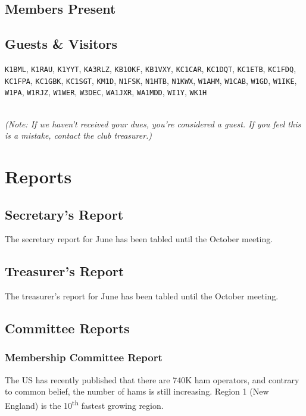 \documentclass[10pt,letterpaper]{article}
\begin{document}
\subsection{Members Present}

\subsection{Guests \& Visitors}
\texttt{K1BML},
\texttt{K1RAU},
\texttt{K1YYT},
\texttt{KA3RLZ},
\texttt{KB1OKF},
\texttt{KB1VXY},
\texttt{KC1CAR},
\texttt{KC1DQT},
\texttt{KC1ETB},
\texttt{KC1FDQ},
\texttt{KC1FPA},
\texttt{KC1GBK},
\texttt{KC1SGT},
\texttt{KM1D},
\texttt{N1FSK},
\texttt{N1HTB},
\texttt{N1KWX},
\texttt{W1AHM},
\texttt{W1CAB},
\texttt{W1GD},
\texttt{W1IKE},
\texttt{W1PA},
\texttt{W1RJZ},
\texttt{W1WER},
\texttt{W3DEC},
\texttt{WA1JXR},
\texttt{WA1MDD},
\texttt{WI1Y},
\texttt{WK1H}

\noindent\\
\emph{(Note: If we haven't received your dues, you're considered a guest. If you feel this is a mistake, contact the club treasurer.)}

\section{Reports}

\subsection{Secretary's Report}

The secretary report for June has been tabled until the October meeting.

\newpage
\subsection{Treasurer's Report}

The treasurer's report for June has been tabled until the October meeting.

\subsection{Committee Reports}

\subsubsection{Membership Committee Report}

The US has recently published that there are 740K ham operators, and contrary to common belief, the number of hams is still increasing. Region 1 (New England) is the 10\textsuperscript{th} fastest growing region.
\end{document}
